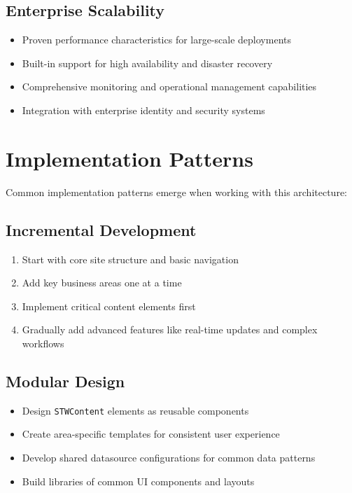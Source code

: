\subsection{Enterprise Scalability}

\begin{itemize}
	\item Proven performance characteristics for large-scale deployments
	\item Built-in support for high availability and disaster recovery
	\item Comprehensive monitoring and operational management capabilities
	\item Integration with enterprise identity and security systems
\end{itemize}

\section{Implementation Patterns}
\label{sec:implementation-patterns}

Common implementation patterns emerge when working with this architecture:

\subsection{Incremental Development}

\begin{enumerate}
	\item Start with core site structure and basic navigation
	\item Add key business areas one at a time
	\item Implement critical content elements first
	\item Gradually add advanced features like real-time updates and complex workflows
\end{enumerate}

\subsection{Modular Design}

\begin{itemize}
	\item Design \texttt{STWContent} elements as reusable components
	\item Create area-specific templates for consistent user experience
	\item Develop shared datasource configurations for common data patterns
	\item Build libraries of common UI components and layouts
\end{itemize}

